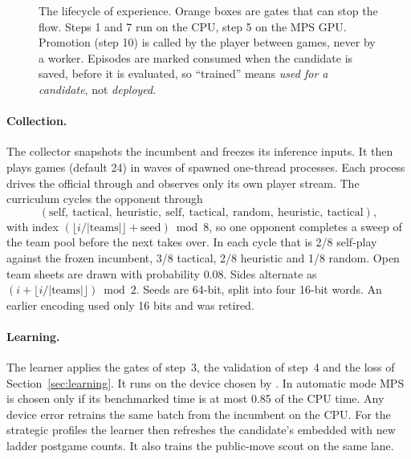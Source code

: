 \begin{figure}[htbp]
{}
\caption{The lifecycle of experience. Orange boxes are gates that can stop
the flow. Steps 1 and 7 run on the CPU, step 5 on the MPS GPU. Promotion
(step 10) is called by the player between games, never by a worker. Episodes
are marked consumed when the candidate is saved, before it is evaluated, so
``trained'' means \emph{used for a candidate}, not \emph{deployed}.}
\label{fig:pipeline}
\end{figure}

\paragraph{Collection.} The collector snapshots the incumbent and freezes
its inference inputs. It then plays  games (default
24) in waves of spawned one-thread processes. Each process drives the
official  through  and observes only
its own player stream. The  curriculum cycles the opponent
through
\[
  (\text{self},\ \text{tactical},\ \text{heuristic},\ \text{self},\ \text{tactical},\ \text{random},\ \text{heuristic},\ \text{tactical}),
\]
with index $(\lfloor i/|\text{teams}|\rfloor+\text{seed})\bmod8$, so one
opponent completes a sweep of the team pool before the next takes over. In
each cycle that is 2/8 self-play against the frozen incumbent, 3/8 tactical,
2/8 heuristic and 1/8 random. Open team sheets are drawn with probability
0.08. Sides alternate as $(i+\lfloor i/|\text{teams}|\rfloor)\bmod2$. Seeds
are 64-bit, split into four 16-bit words. An earlier encoding used only 16
bits and was retired.

\paragraph{Learning.} The learner applies the gates of step~3, the
validation of step~4 and the loss of Section~\ref{sec:learning}. It runs on
the device chosen by . In automatic mode MPS is chosen only
if its benchmarked time is at most 0.85 of the CPU time. Any device error
retrains the same batch from the incumbent on the CPU. For the strategic
profiles the learner then refreshes the candidate's embedded
 with new ladder postgame counts. It also trains the
public-move scout on the same lane.

